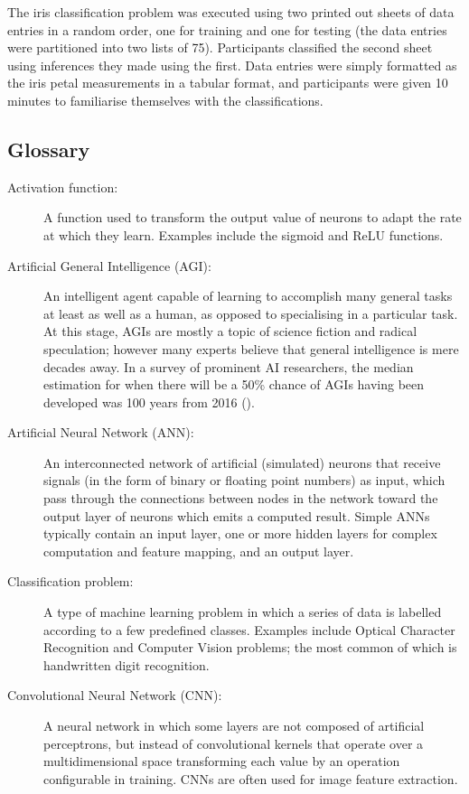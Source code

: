 \documentclass[]{report}
\begin{document}
The iris classification problem was executed using two printed out sheets of data entries in a random order, one for training and one for testing (the data entries were partitioned into two lists of 75). Participants classified the second sheet using inferences they made using the first. Data entries were simply formatted as the iris petal measurements in a tabular format, and participants were given 10 minutes to familiarise themselves with the classifications.

\twocolumn
\label{sec:Glossary}
\subsection{Glossary}
\begin{description}
\item[Activation function:] A function used to transform the output value of neurons to adapt the rate at which they learn. Examples include the sigmoid and ReLU functions.

\item[Artificial General Intelligence (AGI):] An intelligent agent capable of learning to accomplish many general tasks at least as well as a human, as opposed to specialising in a particular task. At this stage, AGIs are mostly a topic of science fiction and radical speculation; however many experts believe that general intelligence is mere decades away. In a survey of prominent AI researchers, the median estimation for when there will be a 50\% chance of AGIs having been developed was 100 years from 2016 (\cite{grace2017will}).

\item[Artificial Neural Network (ANN):] An interconnected network of artificial (simulated) neurons that receive signals (in the form of binary or floating point numbers) as input, which pass through the connections between nodes in the network toward the output layer of neurons which emits a computed result. Simple ANNs typically contain an input layer, one or more hidden layers for complex computation and feature mapping, and an output layer.

\item[Classification problem:] A type of machine learning problem in which a series of data is labelled according to a few predefined classes. Examples include Optical Character Recognition and Computer Vision problems; the most common of which is handwritten digit recognition.

\item[Convolutional Neural Network (CNN):] A neural network in which some layers are not composed of artificial perceptrons, but instead of convolutional kernels that operate over a multidimensional space transforming each value by an operation configurable in training. CNNs are often used for image feature extraction.


\end{description}
\end{document}
